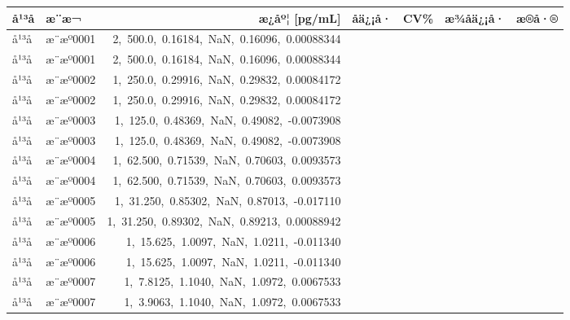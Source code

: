 \documentclass[UTF8,10pt,a4paper,fontset=fandol]{ctexart}
\newcommand{\fieldvalue}[1]{#1}
\begin{document}
\begin{table}[h]
\small
\centering
\begin{tabularx}{\textwidth}{l l r r r r r}
\textbf{å¹³å} & \textbf{æ¨æ¬} & \textbf{æ¿åº¦ [pg/mL]} &
\textbf{åä¿¡å·} & \textbf{CV\%} & \textbf{æ¾åä¿¡å·} & \textbf{æ®å·®} \\
\hline
å¹³å & æ¨æº0001 & 
\fieldvalue{2,\ 500.0,\ 0.16184,\ NaN,\ 0.16096,\ 0.00088344} \\
å¹³å & æ¨æº0001 & 
\fieldvalue{2,\ 500.0,\ 0.16184,\ NaN,\ 0.16096,\ 0.00088344} \\
å¹³å & æ¨æº0002 & 
\fieldvalue{1,\ 250.0,\ 0.29916,\ NaN,\ 0.29832,\ 0.00084172} \\
å¹³å & æ¨æº0002 & 
\fieldvalue{1,\ 250.0,\ 0.29916,\ NaN,\ 0.29832,\ 0.00084172} \\
å¹³å & æ¨æº0003 & 
\fieldvalue{1,\ 125.0,\ 0.48369,\ NaN,\ 0.49082,\ -0.0073908} \\
å¹³å & æ¨æº0003 & 
\fieldvalue{1,\ 125.0,\ 0.48369,\ NaN,\ 0.49082,\ -0.0073908} \\
å¹³å & æ¨æº0004 & 
\fieldvalue{1,\ 62.500,\ 0.71539,\ NaN,\ 0.70603,\ 0.0093573} \\
å¹³å & æ¨æº0004 & 
\fieldvalue{1,\ 62.500,\ 0.71539,\ NaN,\ 0.70603,\ 0.0093573} \\
å¹³å & æ¨æº0005 & 
\fieldvalue{1,\ 31.250,\ 0.85302,\ NaN,\ 0.87013,\ -0.017110} \\
å¹³å & æ¨æº0005 & 
\fieldvalue{1,\ 31.250,\ 0.89302,\ NaN,\ 0.89213,\ 0.00088942} \\
å¹³å & æ¨æº0006 & 
\fieldvalue{1,\ 15.625,\ 1.0097,\ NaN,\ 1.0211,\ -0.011340} \\
å¹³å & æ¨æº0006 & 
\fieldvalue{1,\ 15.625,\ 1.0097,\ NaN,\ 1.0211,\ -0.011340} \\
å¹³å & æ¨æº0007 & 
\fieldvalue{1,\ 7.8125,\ 1.1040,\ NaN,\ 1.0972,\ 0.0067533} \\
å¹³å & æ¨æº0007 & 
\fieldvalue{1,\ 3.9063,\ 1.1040,\ NaN,\ 1.0972,\ 0.0067533} \\
\end{tabularx}
\end{table}
\end{document}
